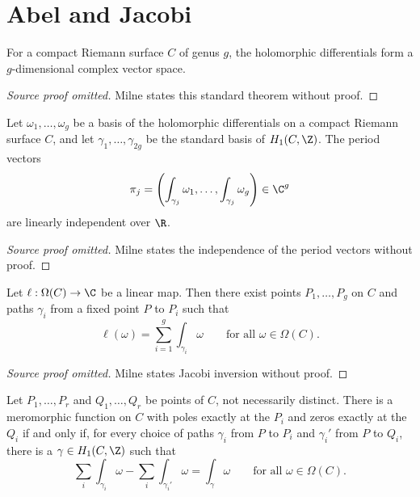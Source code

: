 \section{Abel and Jacobi}
\begin{theorem}\label{thm:milne-holomorphic-differentials}
For a compact Riemann surface $C$ of genus $g$, the holomorphic differentials form a $g$-dimensional complex vector space.
\end{theorem}
\begin{proof}[Source proof omitted]
Milne states this standard theorem without proof.
\end{proof}
\begin{theorem}\label{thm:milne-period-independence}
Let $\omega_1,\ldots,\omega_g$ be a basis of the holomorphic differentials
on a compact Riemann surface $C$, and let $\gamma_1,\ldots,\gamma_{2g}$ be
the standard basis of $H_1(C,\Z)$.  The period vectors
\[
\pi_j=\left(\int_{\gamma_j}\omega_1,\ldots,
\int_{\gamma_j}\omega_g\right)\in\C^g
\]
are linearly independent over $\R$.
\end{theorem}
\begin{proof}[Source proof omitted]
Milne states the independence of the period vectors without proof.
\end{proof}
\begin{theorem}\label{thm:milne-jacobi-inversion}
Let $\ell:\Omega(C)\to\C$ be a linear map.  Then there exist points
$P_1,\ldots,P_g$ on $C$ and paths $\gamma_i$ from a fixed point $P$ to
$P_i$ such that
\[
\ell(\omega)=\sum_{i=1}^g\int_{\gamma_i}\omega
\qquad\text{for all }\omega\in\Omega(C).
\]
\end{theorem}
\begin{proof}[Source proof omitted]
Milne states Jacobi inversion without proof.
\end{proof}
\begin{theorem}\label{thm:milne-abel-theorem}
Let $P_1,\ldots,P_r$ and $Q_1,\ldots,Q_r$ be points of $C$, not
necessarily distinct.  There is a meromorphic function on $C$ with poles
exactly at the $P_i$ and zeros exactly at the $Q_i$ if and only if, for every
choice of paths $\gamma_i$ from $P$ to $P_i$ and $\gamma_i'$ from $P$ to
$Q_i$, there is a $\gamma\in H_1(C,\Z)$ such that
\[
\sum_i\int_{\gamma_i}\omega-\sum_i\int_{\gamma_i'}\omega
 =\int_{\gamma}\omega
\qquad\text{for all }\omega\in\Omega(C).
\]
\end{theorem}
